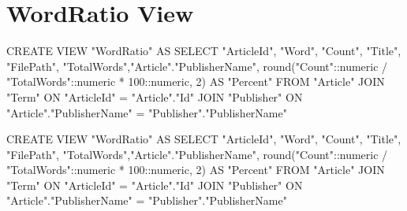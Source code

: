 \section*{WordRatio View}\label{Appendix_WordRatioOld}
CREATE VIEW "WordRatio" AS
SELECT "ArticleId", "Word", "Count", "Title", "FilePath", "TotalWords","Article"."PublisherName",
       round("Count"::numeric / "TotalWords"::numeric * 100::numeric, 2) AS "Percent"
FROM "Article"
         JOIN "Term" ON "ArticleId" = "Article"."Id"
         JOIN "Publisher" ON "Article"."PublisherName" = "Publisher"."PublisherName"

CREATE VIEW "WordRatio" AS
SELECT "ArticleId", "Word", "Count", "Title", "FilePath", "TotalWords","Article"."PublisherName",
       round("Count"::numeric / "TotalWords"::numeric * 100::numeric, 2) AS "Percent"
FROM "Article"
         JOIN "Term" ON "ArticleId" = "Article"."Id"
         JOIN "Publisher" ON "Article"."PublisherName" = "Publisher"."PublisherName"
